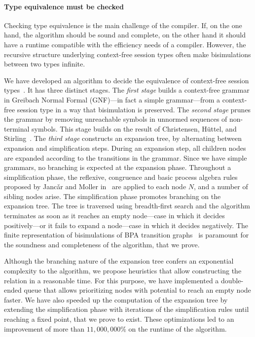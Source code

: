 
\paragraph{Type equivalence must be checked}

Checking type equivalence is the main challenge of the
compiler. If, on the one hand, the algorithm should be sound and 
complete, on the other hand it should have a runtime compatible
with the efficiency needs of a compiler.
However, the recursive structure underlying context-free 
session types often make bisimulations between two types infinite. 

We have developed an algorithm to decide the equivalence of
context-free session types~\cite{typeEquivalence}.  It has three
distinct stages.
%
The \emph{first stage} builds a context-free grammar in Greibach
Normal Formal (GNF)---in fact a simple grammar---from a context-free
session type in a way that bisimulation is preserved.  
%
The \emph{second stage} prunes the grammar by removing unreachable
symbols in unnormed sequences of non-terminal symbols. This stage
builds on the result of Christensen, H\"uttel, and 
Stirling~\cite{DBLP:journals/iandc/ChristensenHS95}.
%
The \emph{third stage} constructs an expansion tree, by alternating
between expansion and simplification steps. During an expansion step, 
all children nodes are expanded according to the transitions in the 
grammar. Since we have simple grammars, no branching is expected at the
expansion phase. Throughout a simplification phase, the reflexive, 
congruence and basic process algebra
rules proposed by Janc\v ar and Moller in~\cite{janvcar1999techniques}
are applied to each node $N$, and a number of sibling nodes arise.
The simplification phase promotes branching on the expansion tree.
The tree is traversed using breadth-first search and the 
algorithm terminates as soon as it reaches an empty node---case
in which it decides positively---or it fails to expand a node---case
in which it decides negatively.  
The finite representation of bisimulations of BPA transition
graphs~\cite{caucal1986decidabilite, DBLP:journals/iandc/ChristensenHS95} 
is paramount for the soundness and completeness of the algorithm,
that we prove. 

Although the branching nature of the expansion tree confers an exponential 
complexity to the algorithm, we propose heuristics that allow constructing 
the relation in a reasonable time. For this purpose, we have implemented a
double-ended queue that allows prioritizing nodes with potential to 
reach an empty node faster. 
We have also speeded up the computation of the expansion
tree by extending the simplification phase with iterations of the 
simplification rules until reaching a fixed point, that we prove to exist.
These optimizations led to an improvement of more than $11,000,000\%$
on the runtime of the algorithm.

